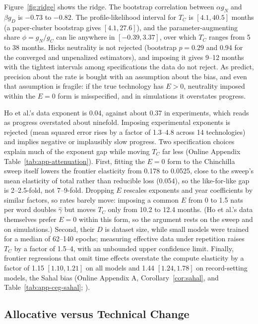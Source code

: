 Figure~\ref{fig:ridge} shows the ridge. The bootstrap correlation between $\alpha g_N$ and $\beta g_D$ is $-0.73$ to
$-0.82$. The profile-likelihood interval for $T_C$ is $[4.1,40.5]$ months (a paper-cluster bootstrap gives
$[4.1,27.6]$), and the parameter-augmenting share $\phi=g_N/g_C$ can lie anywhere in $[-0.39,3.37]$, over which $T_C$
ranges from 5 to 38 months. Hicks neutrality is not rejected (bootstrap $p=0.29$ and 0.94 for the converged and unpenalized estimators), and
imposing it gives 9--12 months with the tightest intervals among specifications the data do not reject. As
\citet{diamond1978measurement} predict, precision about the rate is bought with an assumption about the bias, and even
that assumption is fragile: if the true technology has $E>0$, neutrality imposed within the $E=0$ form is misspecified,
and in simulations it overstates progress.

Ho et al.'s data exponent is 0.04, against about 0.37 in experiments, which \citet{whitfill2025note} reads as progress
overstated about ninefold. Imposing experimental exponents is rejected (mean squared error rises by a factor of 1.3--4.8
across 14 technologies) and implies negative or implausibly slow progress. Two specification choices explain much of the
exponent gap while moving $T_C$ far less (Online Appendix Table~\ref{tab:app-attenuation}). First, fitting the $E=0$ form to the Chinchilla sweep itself lowers the
frontier elasticity from 0.178 to 0.0525, close to the sweep's mean elasticity of total rather than reducible loss
(0.054), so the like-for-like gap is 2--2.5-fold, not 7--9-fold. Dropping $E$ rescales exponents and year coefficients
by similar factors, so rates barely move: imposing a common $E$ from 0 to 1.5 nats per word doubles $\hat\gamma$ but
moves $T_C$ only from 10.2 to 12.4 months. (Ho et al.'s data themselves prefer $E=0$ within this form, so the argument
rests on the sweep and on simulations.) Second, their $D$ is dataset size, while small models were trained for a median
of 62--140 epochs; measuring effective data under repetition \citep{muennighoff2023scaling} raises $T_C$ by a factor of
1.5--4, with an unbounded upper confidence limit. Finally, frontier regressions that omit time effects overstate the compute
elasticity by a factor of 1.15 $[1.10,1.21]$ on all models and 1.44 $[1.24,1.78]$ on record-setting models, the Sahal bias (Online Appendix A,
Corollary~\ref{cor:sahal}, and Table~\ref{tab:app-ceg-sahal}; \citealp{nagy2013statistical}).

\subsection{Allocative versus Technical Change}

